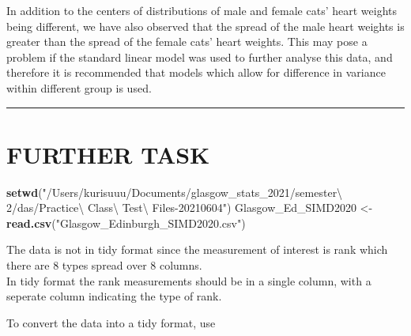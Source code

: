\documentclass[
]{article}
\newenvironment{Shaded}{\begin{snugshade}}{\end{snugshade}}
\newcommand{\DataTypeTok}[1]{\textcolor[rgb]{0.13,0.29,0.53}{#1}}
\newcommand{\KeywordTok}[1]{\textcolor[rgb]{0.13,0.29,0.53}{\textbf{#1}}}
\newcommand{\NormalTok}[1]{#1}
\newcommand{\OperatorTok}[1]{\textcolor[rgb]{0.81,0.36,0.00}{\textbf{#1}}}
\newcommand{\StringTok}[1]{\textcolor[rgb]{0.31,0.60,0.02}{#1}}
\begin{document}
In addition to the centers of distributions of male and female cats'
heart weights being different, we have also observed that the spread of
the male heart weights is greater than the spread of the female cats'
heart weights. This may pose a problem if the standard linear model was
used to further analyse this data, and therefore it is recommended that
models which allow for difference in variance within different group is
used.

\begin{center}\rule{0.5\linewidth}{0.5pt}\end{center}

\newpage

\hypertarget{further-task}{%
\section{FURTHER TASK}\label{further-task}}

\begin{Shaded}
\begin{Highlighting}[]
\KeywordTok{setwd}\NormalTok{(}\StringTok{"/Users/kurisuuu/Documents/glasgow_stats_2021/semester\textbackslash{} 2/das/Practice\textbackslash{} Class\textbackslash{} Test\textbackslash{} Files-20210604"}\NormalTok{)}
\NormalTok{Glasgow_Ed_SIMD2020 <-}\StringTok{ }\KeywordTok{read.csv}\NormalTok{(}\StringTok{"Glasgow_Edinburgh_SIMD2020.csv"}\NormalTok{)}
\end{Highlighting}
\end{Shaded}

The data is not in tidy format since the measurement of interest is rank
which there are 8 types spread over 8 columns.\\
In tidy format the rank measurements should be in a single column, with
a seperate column indicating the type of rank.

To convert the data into a tidy format, use

\begin{Shaded}
\end{Shaded}
\end{document}
